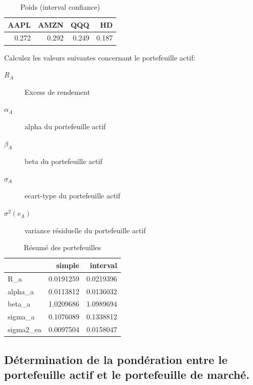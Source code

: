 \documentclass[
]{article}
\begin{document}
\begin{table}[H]

\caption{\label{tab:unnamed-chunk-14}Poids (interval confiance)}
\centering
\begin{tabular}[t]{rrrr}
\toprule
AAPL & AMZN & QQQ & HD\\
\midrule
0.272 & 0.292 & 0.249 & 0.187\\
\bottomrule
\end{tabular}
\end{table}

Calculez les valeurs suivantes concernant le portefeuille actif:

\begin{description}
\item[$R_A$] Excess de rendement
\item[$\alpha_A$] alpha du portefeuille actif
\item[$\beta_A$]  beta du portefeuille actif
\item[$\sigma_A$] ecart-type du portefeuille actif
\item[$\sigma^2(e_A)$] variance résiduelle du portefeuille actif

\end{description}

\begin{table}[H]

\caption{\label{tab:unnamed-chunk-16}Résumé des portefeuilles}
\centering
\begin{tabular}[t]{lrr}
\toprule
  & simple & interval\\
\midrule
R\_a & 0.0191259 & 0.0219396\\
alpha\_a & 0.0113812 & 0.0136032\\
beta\_a & 1.0209686 & 1.0989694\\
sigma\_a & 0.1076089 & 0.1338812\\
sigma2\_ea & 0.0097504 & 0.0158047\\
\bottomrule
\end{tabular}
\end{table}

\hypertarget{duxe9termination-de-la-ponduxe9ration-entre-le-portefeuille-actif-et-le-portefeuille-de-marchuxe9.}{%
\subsection{Détermination de la pondération entre le portefeuille actif
et le portefeuille de
marché.}\label{duxe9termination-de-la-ponduxe9ration-entre-le-portefeuille-actif-et-le-portefeuille-de-marchuxe9.}}
\end{document}
